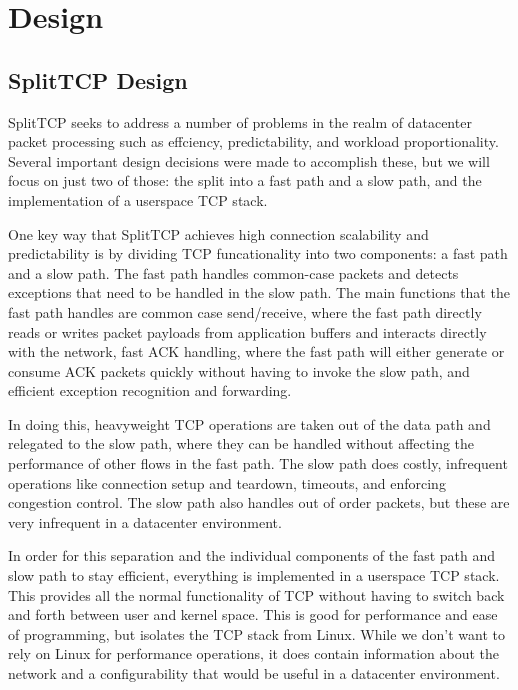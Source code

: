 \section{Design}\label{Design}

\subsection{SplitTCP Design}

SplitTCP seeks to address a number of problems in the realm of datacenter packet
processing such as effciency, predictability, and workload proportionality. 
Several important design decisions were made to accomplish these, but we will 
focus on just two of those: the split into a fast path and a slow path, and the
implementation of a userspace TCP stack.

One key way that SplitTCP achieves high connection scalability and 
predictability is by dividing TCP funcationality into two components: a fast 
path and a slow path. The fast path handles common-case packets and detects 
exceptions that need to be handled in the slow path. The main functions that
the fast path handles are common case send/receive, where the fast path directly
reads or writes packet payloads from application buffers and interacts directly
with the network, fast ACK handling, where the fast path will either generate or
consume ACK packets quickly without having to invoke the slow path, and 
efficient exception recognition and forwarding. 

In doing this, heavyweight TCP operations are taken out of the data path and 
relegated to the slow path, where they can be handled without affecting the 
performance of other flows in the fast path. The slow path does costly, 
infrequent operations like connection setup and teardown, timeouts, and 
enforcing congestion control. The slow path also handles out of order packets, 
but these are very infrequent in a datacenter environment.
   
In order for this separation and the individual components of the fast path 
and slow path to stay efficient, everything is implemented in a userspace TCP
stack. This provides all the normal functionality of TCP without having to 
switch back and forth between user and kernel space. This is good for 
performance and ease of programming, but isolates the TCP stack from Linux.
While we don't want to rely on Linux for performance operations, it does contain
information about the network and a configurability that would be useful in a 
datacenter environment.

